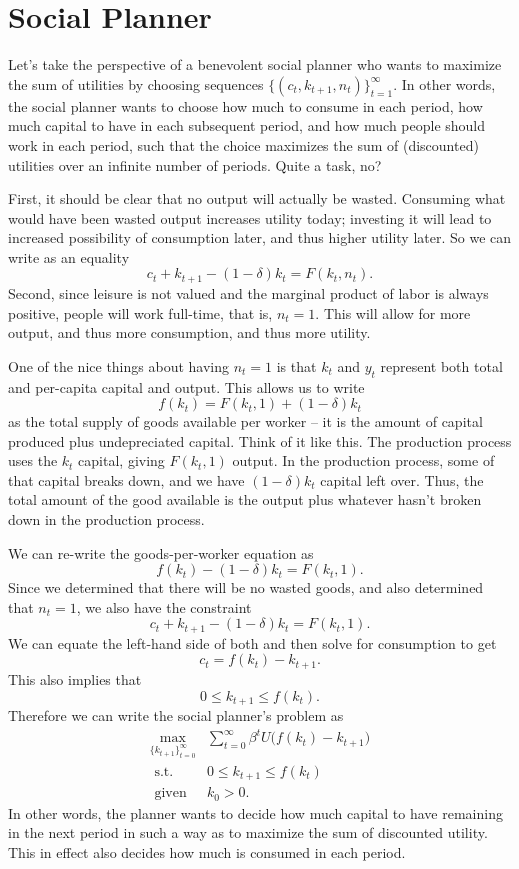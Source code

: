 \documentclass[12pt]{article}
\theoremstyle{definition}
\begin{document}
\section{Social Planner}

Let's take the perspective of a benevolent social planner who wants to maximize the sum of utilities by choosing sequences $\{(c_t, k_{t+1}, n_t) \}_{t=1}^{\infty}$. In other words, the social planner wants to choose how much to consume in each period, how much capital to have in each subsequent period, and how much people should work in each period, such that the choice maximizes the sum of (discounted) utilities over an infinite number of periods. Quite a task, no?

First, it should be clear that no output will actually be wasted. Consuming what would have been wasted output increases utility today; investing it will lead to increased possibility of consumption later, and thus higher utility later. So we can write as an equality
	\[c_t + k_{t+1} - (1 - \delta)k_t = F(k_t, n_t).	\]
Second, since leisure is not valued and the marginal product of labor is always positive, people will work full-time, that is, $n_t=1$. This will allow for more output, and thus more consumption, and thus more utility. 

One of the nice things about having $n_t=1$ is that $k_t$ and $y_t$ represent both total and per-capita capital and output. This allows us to write
	\[f(k_t) = F(k_t,1) + (1 - \delta)k_t\]
as the total supply of goods available per worker -- it is the amount of capital produced plus undepreciated capital. Think of it like this. The production process uses the $k_t$ capital, giving $F(k_t,1)$ output. In the production process, some of that capital breaks down, and we have $(1 - \delta)k_t$ capital left over. Thus, the total amount of the good available  is the output plus whatever hasn't broken down in the production process.

We can re-write the goods-per-worker equation as 
	\[f(k_t) - (1 - \delta)k_t = F(k_t,1).\]
Since we determined that there will be no wasted goods, and also determined that $n_t=1$, we also have the constraint 
	\[c_t + k_{t+1} - (1 - \delta)k_t = F(k_t, 1).\]
We can equate the left-hand side of both and then solve for consumption to get
	\[c_t =  f(k_t) - k_{t + 1}.\]
This also implies that
	\[0 \leq k_{t+1} \leq f(k_t).	\]
Therefore we can write the social planner's problem as
\begin{align}
	\max_{ \{k_{t+1} \}_{t =0}^{\infty} } &\sum_{t = 0}^{\infty} \beta^t U\big( f(k_t) - k_{t + 1} \big) \label{spobjective}\\
	\text{ s.t. } \;\; &0 \leq k_{t+1} \leq f(k_t) \label{spcond}\\
	\text{ given} \;\; &k_0 > 0.
\end{align}
In other words, the planner wants to decide how much capital to have remaining in the next period in such a way as to maximize the sum of discounted utility. This in effect also decides how much is consumed in each period. 
\end{document}
